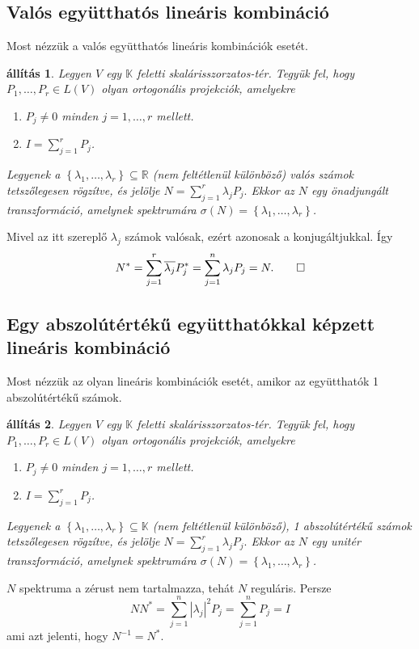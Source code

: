 \documentclass[a4paper, showtrims]{memoir}
\makeatletter
\renewenvironment{proof}[1][\proofname]
    {\par\pushQED{\qed}%
    \normalfont \topsep6\p@\@plus6\p@\relax
    \trivlist
    \item[\hskip\labelsep
        \itshape
    #1\@addpunct{:}]\ignorespaces}
    {\popQED\endtrivlist\@endpefalse}
\theoremstyle{plain}
\newtheorem{proposition}{állítás}[chapter]
\theoremstyle{remark}
\theoremstyle{definition}
\makeatother
\begin{document}
\subsection{Valós együtthatós lineáris kombináció}
Most nézzük a valós együtthatós lineáris kombinációk esetét.
\begin{proposition}\label{pr:normlinkombvalos}
	Legyen $V$ egy $\mathbb{K}$ feletti skalárisszorzatos-tér.
	Tegyük fel, hogy $P_1,\ldots,P_r\in L\left( V \right)$ olyan ortogonális projekciók,
	amelyekre
	\begin{enumerate}
		\item $P_j\neq 0$ minden $j=1,\ldots,r$ mellett.
		\item $I=\sum_{j=1}^rP_j$.
	\end{enumerate}
	Legyenek a $\left\{ \lambda_1,\ldots,\lambda_r \right\}\subseteq \mathbb{R}$
	(nem feltétlenül különböző) valós számok tetszőlegesen rögzítve,
	és jelölje
	\(
	N
	=
	\sum_{j=1}^r\lambda_jP_j.
	\)
	Ekkor az $N$ egy \emph{önadjungált} transzformáció,
	amelynek spektrumára $\sigma\left( N \right)=\left\{ \lambda_1,\ldots,\lambda_r \right\}$.
\end{proposition}
\begin{proof}
	Mivel az itt szereplő $\lambda_j$ számok valósak,
	ezért azonosak a konjugáltjukkal.
	Így
	\begin{displaymath}
		N^\ast=
		\sum_{j=1}^r\overline{\lambda_j}P_j^\ast
		=
		\sum_{j=1}^n\lambda_jP_j
		=N.
		\qedhere
	\end{displaymath}
\end{proof}

\subsection{Egy abszolútértékű együtthatókkal képzett lineáris kombináció}
Most nézzük az olyan lineáris kombinációk esetét, amikor az együtthatók 1 abszolútértékű számok.
\begin{proposition}\label{pr:normlinkombegys}
	Legyen $V$ egy $\mathbb{K}$ feletti skalárisszorzatos-tér.
	Tegyük fel, hogy $P_1,\ldots,P_r\in L\left( V \right)$ olyan ortogonális projekciók,
	amelyekre
	\begin{enumerate}
		\item $P_j\neq 0$ minden $j=1,\ldots,r$ mellett.
		\item $I=\sum_{j=1}^rP_j$.
	\end{enumerate}
	Legyenek a $\left\{ \lambda_1,\ldots,\lambda_r \right\}\subseteq \mathbb{K}$
	(nem feltétlenül különböző),
	1 abszolútértékű számok tetszőlegesen rögzítve,
	és jelölje
	\(
	N
	=
	\sum_{j=1}^r\lambda_jP_j.
	\)
	Ekkor az $N$ egy \emph{unitér transzformáció},
	amelynek spektrumára $\sigma\left( N \right)=\left\{ \lambda_1,\ldots,\lambda_r \right\}$.
\end{proposition}
\begin{proof}
	$N$ spektruma a zérust nem tartalmazza, tehát $N$ reguláris.
	Persze $$NN^\ast=\sum_{j=1}^n|\lambda_j|^2P_j=\sum_{j=1}^nP_j=I$$ ami azt jelenti,
	hogy $N^{-1}=N^\ast$.
\end{proof}
\end{document}

